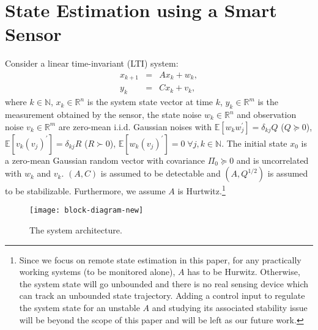 \documentclass[twocolumn]{autart}    \usepackage{cite}
\begin{document}
{\section{State Estimation using a Smart Sensor} \label{sec:problem-setup}
Consider a linear time-invariant (LTI) system:
\begin{eqnarray}
  x_{k+1} & = & Ax_k + w_k, \label{eqn:process-dynamics} \\
  y_k & = & Cx_k + v_k,  \label{eqn:measurement-equation}
\end{eqnarray}
where  $k\in \mathbb{N}$, $x_k \in \mathbb{R}^{n}$ is the system state vector at time $k$, $y_k\in \mathbb{R}^{m}$ is the measurement obtained by the sensor, the state noise $w_{k} \in\mathbb{R}^{n} $ and observation noise $v_k \in \mathbb{R}^{m}$ are zero-mean i.i.d. Gaussian noises with $\mathbb{E}[w_{k}w_{j}^\prime] =\delta_{kj}Q$ ($Q\succeq 0$), $\mathbb{E}[v_{k}(v_{j})^\prime] = \delta_{kj}R$ ($R \succ 0$), $\mathbb{E}[w_{k}(v_{j})^\prime] = 0 \; \forall j,k\in\mathbb{N}$. The initial state $x_0$ is a zero-mean Gaussian random vector with covariance $\Pi_0\succeq 0$ and is uncorrelated with $w_k$ and $v_k$. $(A, C)$ is assumed to be detectable and $(A, Q^{1/2})$ is assumed to be stabilizable. Furthermore, we assume $A$ is Hurtwitz.\footnote{{Since we focus on remote state estimation in this paper, for any practically working systems (to be monitored alone), $A$ has to be Hurwitz. Otherwise, the system state will go unbounded and there is no real sensing device which can track an unbounded state trajectory. Adding a control input to regulate the system state for an unstable $A$ and studying its associated stability issue will be beyond the scope of this paper and will be left as our future work.}}

\begin{figure}[htbp]
\centering
  \texttt{[image: block-diagram-new]}
  \caption{The system architecture.} \label{fig:system}
\end{figure}

}
\end{document}
